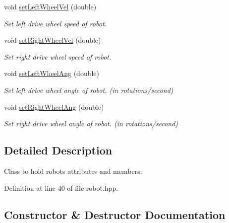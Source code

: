 \begin{DoxyCompactItemize}
void \hyperlink{classRobot_ab86642effe20a530827e4c2fc457ddb4}{set\+Left\+Wheel\+Vel} (double)
\begin{DoxyCompactList}\small\item\em Set left drive wheel speed of robot. \end{DoxyCompactList}\item 
void \hyperlink{classRobot_a89e3ada15839330f45c350b67ba746f3}{set\+Right\+Wheel\+Vel} (double)
\begin{DoxyCompactList}\small\item\em Set right drive wheel speed of robot. \end{DoxyCompactList}\item 
void \hyperlink{classRobot_adbe4d758d302d3fa70fedf5af9c82afc}{set\+Left\+Wheel\+Ang} (double)
\begin{DoxyCompactList}\small\item\em Set left drive wheel angle of robot. (in rotations/second) \end{DoxyCompactList}\item 
void \hyperlink{classRobot_a3d7a12ec4cd50436d46363de93a4f9b2}{set\+Right\+Wheel\+Ang} (double)
\begin{DoxyCompactList}\small\item\em Set right drive wheel angle of robot. (in rotations/second) \end{DoxyCompactList}\end{DoxyCompactItemize}


\subsection{Detailed Description}
Class to hold robot\textquotesingle{}s attributes and members. 

Definition at line 40 of file robot.\+hpp.



\subsection{Constructor \& Destructor Documentation}
\mbox{\label{classRobot_a56b15a9c98244188ed610f62569a0aa0}} 
